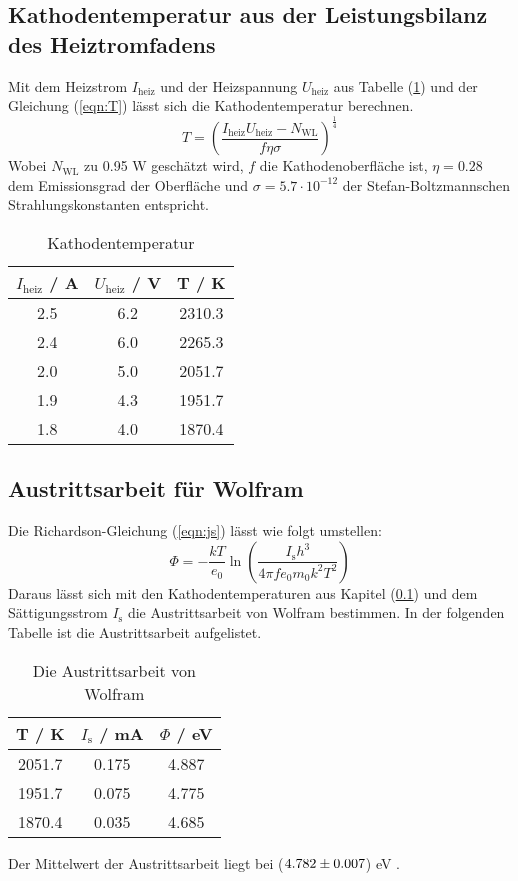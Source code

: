 \subsection{Kathodentemperatur aus der Leistungsbilanz des Heiztromfadens}
\label{sec:K}
Mit dem Heizstrom $I_\text{heiz}$ und der Heizspannung $U_\text{heiz}$ aus Tabelle (\ref{tab:heiz}) und der Gleichung (\ref{eqn:T}) lässt sich die Kathodentemperatur berechnen.
\begin{equation}
  T = \left(\frac{I_\text{heiz} U_\text{heiz} - N_\text{WL}}{f \eta \sigma}\right)^{\frac{1}{4}}
  \label{eqn:T}
\end{equation}
Wobei $N_\text{WL}$ zu 0.95 W geschätzt wird, $f$ die Kathodenoberfläche ist, $\eta = 0.28$ dem Emissionsgrad der Oberfläche und $\sigma = 5.7 \cdot 10^{-12}$ der Stefan-Boltzmannschen Strahlungskonstanten entspricht.

\begin{table}[H]
  \centering
  \begin{tabular}{c c c}
    \toprule
    $I_\text{heiz}$ / A & $U_\text{heiz}$ / V & T / K \\
    \midrule
    2.5 & 6.2 & 2310.3 \\
    2.4 & 6.0 & 2265.3 \\
    2.0 & 5.0 & 2051.7 \\
    1.9 & 4.3 & 1951.7 \\
    1.8 & 4.0 & 1870.4 \\
    \bottomrule
  \end{tabular}
  \caption{Kathodentemperatur}
  \label{tab:heiz}
\end{table}

\subsection{Austrittsarbeit für Wolfram}
Die Richardson-Gleichung (\ref{eqn:js}) lässt wie folgt umstellen:
\begin{equation}
  \Phi = - \frac{k T}{e_0} \ln \left(\frac{I_\text{s} h^3}{4 \pi f e_0 m_0 k^2 T^2}\right)
\end{equation}
Daraus lässt sich mit den Kathodentemperaturen aus Kapitel (\ref{sec:K}) und dem Sättigungsstrom $I_\text{s}$ die Austrittsarbeit von Wolfram bestimmen. In der folgenden Tabelle ist die Austrittsarbeit aufgelistet.

\begin{table}[H]
  \centering
  \begin{tabular}{c c c}
    \toprule
    T / K & $I_\text{s}$ / mA & $\Phi$ / eV \\
    \midrule
    2051.7 & 0.175 & 4.887 \\
    1951.7 & 0.075 & 4.775 \\
    1870.4 & 0.035 & 4.685 \\
    \bottomrule
  \end{tabular}
  \caption{Die Austrittsarbeit von Wolfram}
  \label{tab:}
\end{table}

Der Mittelwert der Austrittsarbeit liegt bei ($\num{4.782 +- 0.007}$) eV .
